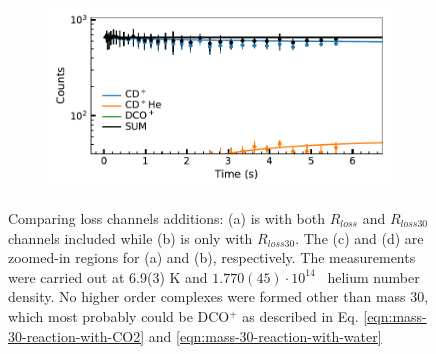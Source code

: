 \begin{figure}[!htb]
\begin{subfigure}[b]{0.49\textwidth}
    \end{subfigure}
    \hfill
    \begin{subfigure}[b]{0.49\textwidth}
        \centering
        \includegraphics[width=1\textwidth]{figures/measurements/kinetics/loss_channels/trap_and_m_30_loss_zoomed.pdf}
        \caption{}
        
    \end{subfigure}
    
    
        
    
    \caption{Comparing loss channels additions: (a) is with both $R_{loss}$ and $R_{loss30}$ channels included while (b) is only with $R_{loss30}$. The (c) and (d) are zoomed-in regions for (a) and (b), respectively. The measurements were carried out at 6.9(3) K and  $1.770(45) \cdot 10^{14}$ \percc\ helium number density. No higher order complexes were formed other than mass 30, which most probably could be DCO$^+$ as described in Eq. \ref{eqn:mass-30-reaction-with-CO2} and \ref{eqn:mass-30-reaction-with-water}}
    
    \label{fig:trap-and-m30-loss-channel-comparision}
\end{figure}